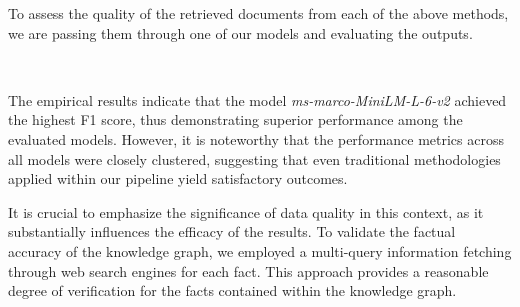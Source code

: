 To assess the quality of the retrieved documents from each of the above methods, we are passing them through one of our models and evaluating the outputs.

\begin{table}[h!]
    \centering
    \noindent
    {\scriptsize {}}\\
    \caption{Evaluation Results for Different Retrieval Methods through the Pipeline (just with the Gemma2 model)}
    \label{tab:evaluation_results}
\end{table}

The empirical results indicate that the model \textit{ms-marco-MiniLM-L-6-v2} achieved the highest F1 score, thus demonstrating superior performance among the evaluated models.
However, it is noteworthy that the performance metrics across all models were closely clustered, suggesting that even traditional methodologies applied within our pipeline yield satisfactory outcomes.

It is crucial to emphasize the significance of data quality in this context, as it substantially influences the efficacy of the results.
To validate the factual accuracy of the knowledge graph, we employed a multi-query information fetching through web search engines for each fact.
This approach provides a reasonable degree of verification for the facts contained within the knowledge graph.

